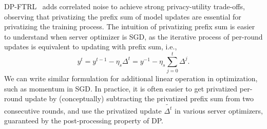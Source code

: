 DP-FTRL~\citep{kairouz21practical} adds correlated noise to achieve strong privacy-utility trade-offs, observing that privatizing the prefix sum of model updates are essential for privatizing the training process.
The intuition of privatizing prefix sum is easier to understand when server optimizer is SGD, as the iterative process of per-round updates is equivalent to updating with prefix sum, i.e.,  
$$y^t=y^{t-1} - \eta_s \Delta^t = y^{-1}- \eta_s \sum_{j=0}^{t} \Delta^j.$$ We can write similar formulation for additional linear operation in optimization, such as momentum in SGD. In practice, it is often easier to get privatized per-round update by (conceptually) subtracting the privatized prefix sum from two consecutive rounds, and use the privatized update $\tilde{\Delta^t}$ in various server optimizers, guaranteed by the post-processing property of DP. 

